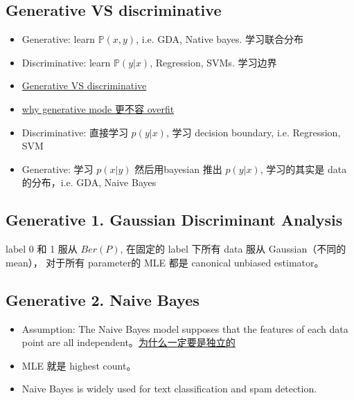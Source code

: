 \documentclass[12pt]{article}
\numberwithin{theorem}{section} %
\numberwithin{definition}{section} %
\numberwithin{assumption}{section} %
\numberwithin{lemma}{section} %
\numberwithin{remark}{section} %
\numberwithin{prop}{section} %
\numberwithin{corollary}{section} %
\numberwithin{example}{section} %
\numberwithin{question}{section} %
\numberwithin{problem}{section} %
\numberwithin{conjecture}{section} %
\numberwithin{append}{section} %
\numberwithin{property}{section} %
\def\P{{\mathbb P}}     %
\begin{document}
\begin{CJK}{UTF8}{gbsn}
\section{Generative VS discriminative}

\begin{itemize}
	\item Generative: learn $\P(x,y)$, i.e. GDA, Native bayes. 学习联合分布
	\item Discriminative: learn $\P(y|x)$, Regression, SVMs. 学习边界
	\item \href{https://www.zhihu.com/question/20446337}{Generative VS discriminative}
	\item \href{https://stats.stackexchange.com/questions/91484/do-discriminative-models-overfit-more-than-generative-models}{why generative mode 更不容 overfit}
	\item Discriminative: 直接学习 $p(y|x)$, 学习 decision boundary, i.e. Regression, SVM
	\item Generative: 学习 $p(x|y)$ 然后用bayesian 推出 $p(y|x)$, 学习的其实是 data 的分布，i.e. GDA, Naive Bayes
\end{itemize}

\subsection{Generative 1. Gaussian Discriminant Analysis}

label 0 和 1 服从 $Ber(P)$, 在固定的 label 下所有 data 服从 Gaussian（不同的mean）， 对于所有 parameter的 MLE 都是 canonical unbiased estimator。

\subsection{Generative 2. Naive Bayes }
\begin{itemize}
\item Assumption: The Naive Bayes model supposes that the features of each data point are all independent。\href{https://zhuanlan.zhihu.com/p/37575364}{为什么一定要是独立的}
\item MLE 就是 highest count。
\item Naive Bayes is widely used for text classification and spam detection.
\end{itemize}












\end{CJK}
\end{document}
